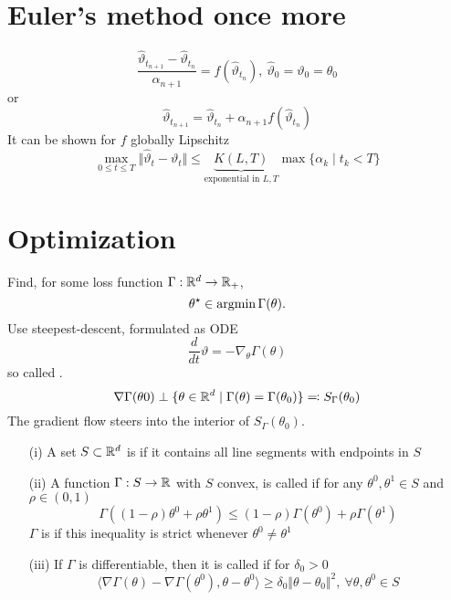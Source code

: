 \section{Euler's method once more}
\begin{equation}\label{eq:euler_v2}
    \frac{\hat{\vartheta}_{t_{n+1}}-\hat{\vartheta}_{t_{n}}}{\alpha_{n+1}} = f(\hat{\vartheta}_{t_n}),\ \hat{\vartheta}_0=\vartheta_0=\theta_0
\end{equation}
or \[\hat{\vartheta}_{t_{n+1}}= \hat{\vartheta}_{t_{n}}+\alpha_{n+1} f(\hat{\vartheta}_{t_n})\]
It can be shown for \(f\) globally Lipschitz
\begin{equation}
    \max_{0\leq t\leq T}\Vert \hat{\vartheta}_t-\vartheta_t\Vert \leq \underbrace{K(L,T)}_{\text{exponential in }L,T}\max\{\alpha_k\mid t_k< T\}
\end{equation} 

\section{Optimization}

 Find, for some loss function \(\Gamma:\mathbb{R}^d\to \mathbb{R}_+\),
\begin{equation}
    \theta^\star\in\operatorname*{\text{argmin}} \Gamma(\theta).
\end{equation} 
Use steepest-descent, formulated as ODE 
\begin{equation}\label{eq:gradient_flow}\frac{d}{dt}\vartheta=-\nabla_\theta \Gamma(\theta)\end{equation}
so called .
\[\nabla \Gamma(\theta0)\perp \{\theta\in\mathbb{R}^d\mid \Gamma(\theta)=\Gamma(\theta_0)\}\eqqcolon S_{\Gamma}(\theta_0)\]
The gradient flow steers into the interior of \(S_{\Gamma}(\theta_0)\).

\begin{definition}\label{def:28}
    \begin{enumerate}
        \item[(i)] A set \(S\subset \mathbb{R}^d\) is  if it contains all line segments with endpoints in \(S\)
        \item[(ii)] A function \(\Gamma:S\to\mathbb{R}\) with \(S\) convex, is called  
                    if for any \(\theta^0,\theta^1\in S\) and \(\rho\in (0,1)\) 
                    \[\Gamma((1-\rho)\theta^0+\rho\theta^1)\leq (1-\rho)\Gamma(\theta^0)+\rho\Gamma(\theta^1)\]
                    \(\Gamma\) is  if this inequality is strict whenever \(\theta^0\neq\theta^1\)
        \item[(iii)] If \(\Gamma\) is differentiable, then it is called  if for \(\delta_0>0\)
                     \[\langle\nabla \Gamma(\theta)-\nabla\Gamma(\theta^0),\theta-\theta^0\rangle\geq \delta_0 \Vert \theta-\theta_0\Vert^2,\ \forall \theta,\theta^0\in S\]           
    \end{enumerate}
\end{definition}

